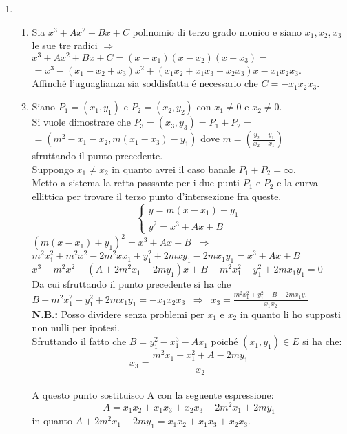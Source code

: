 \documentclass[a4paper]{article}
\newcommand{\sist}{\begin{cases}}
\newcommand{\esist}{\end{cases}}
\newcommand{\ds}{\displaystyle}
\begin{document}
\begin{enumerate}
\item \begin{enumerate}
\item Sia $x^3+Ax^2+Bx+C$ polinomio di terzo grado monico e siano $x_1,x_2,x_3$ le sue tre radici $\Rightarrow$\\
$x^3+Ax^2+Bx+C=(x-x_1)(x-x_2)(x-x_3)=$\\$=x^3-(x_1+x_2+x_3)x^2+(x_1x_2+x_1x_3+x_2x_3)x -x_1x_2x_3$.\\
Affinch\'e l'uguaglianza sia soddisfatta \'e necessario che $C=-x_1x_2x_3$.\\


\item Siano $P_1=(x_1,y_1)$ e $P_2=(x_2,y_2)$ con $x_1\neq 0$ e $x_2\neq 0$.\\
Si vuole dimostrare che $P_3=(x_3,y_3)=P_1+P_2=$\\
$=(m^2-x_1-x_2,m(x_1-x_3)-y_1)$ dove 
$m=\ds{\left(\frac{y_2-y_1}{x_2-x_1}\right)}$\\
sfruttando il punto precedente.\\
Suppongo $x_1\neq x_2$ in quanto avrei il caso banale $P_1+P_2=\infty$.\\
Metto a sistema la retta passante per i due punti $P_1$ e $P_2$ e la curva ellittica per trovare il terzo punto d'intersezione fra queste.
$$\sist
y = m(x-x_1) +y_1 \\
y^2=x^3+Ax+B
\esist$$
$(m(x-x_1)+y_1)^2=x^3+Ax+B \;\;\Rightarrow\;\;$ \\
$m^2x_1^2+m^2x^2-2m^2xx_1+y_1^2+2mxy_1-2mx_1y_1=x^3+Ax+B$\\ 
$x^3-m^2x^2+(A+2m^2x_1-2my_1)x+B-m^2x_1^2-y_1^2+2mx_1y_1=0$ \\
Da cui sfruttando il punto precedente si ha che\\
$B-m^2x_1^2-y_1^2+2mx_1y_1=-x_1x_2x_3\;\;\Rightarrow\;\;x_3=\ds{\frac{m^2x_1^2+y_1^2-B-2mx_1y_1}{x_1x_2}}$\\
\textbf{N.B.:} Posso dividere senza problemi per $x_1$ e $x_2$ in quanto li ho supposti non nulli per ipotesi.\\
Sfruttando il fatto che $B=y_1^2-x_1^3-A x_1$ poich\'e $(x_1,y_1)\in E$ si ha che:\\
$$x_3=\ds{\frac{m^2x_1+x_1^2+A-2my_1}{x_2}}$$\\
A questo punto sostituisco A con la seguente espressione:\\
$$A=x_1x_2+x_1x_3+x_2x_3-2m^2x_1+2my_1$$
in quanto 
$A+2m^2x_1-2my_1=x_1x_2+x_1x_3+x_2x_3$.\\

\end{enumerate}
\end{enumerate}
\end{document}
